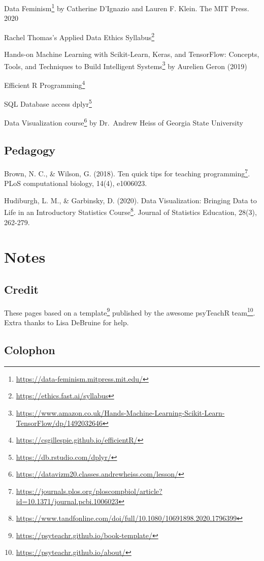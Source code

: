 \documentclass[
  12pt,
  a5paper,
]{book}
\DeclareRobustCommand{\href}[2]{#2\footnote{\url{#1}}}
\begin{document}
\href{https://data-feminism.mitpress.mit.edu/}{Data Feminism} by Catherine D'Ignazio and Lauren F. Klein. The MIT Press. 2020

Rachel Thomas's \href{https://ethics.fast.ai/syllabus}{Applied Data Ethics Syllabus}

\href{https://www.amazon.co.uk/Hands-Machine-Learning-Scikit-Learn-TensorFlow/dp/1492032646}{Hands-on Machine Learning with Scikit-Learn, Keras, and TensorFlow: Concepts, Tools, and Techniques to Build Intelligent Systems} by Aurelien Geron (2019)

\href{https://csgillespie.github.io/efficientR/}{Efficient R Programming}

SQL \href{https://db.rstudio.com/dplyr/}{Database access dplyr}

\href{https://datavizm20.classes.andrewheiss.com/lesson/}{Data Visualization course} by Dr.~Andrew Heiss of Georgia State University

\hypertarget{pedagogy}{%
\section{Pedagogy}\label{pedagogy}}

Brown, N. C., \& Wilson, G. (2018). \href{https://journals.plos.org/ploscompbiol/article?id=10.1371/journal.pcbi.1006023}{Ten quick tips for teaching programming}. PLoS computational biology, 14(4), e1006023.

Hudiburgh, L. M., \& Garbinsky, D. (2020). \href{https://www.tandfonline.com/doi/full/10.1080/10691898.2020.1796399}{Data Visualization: Bringing Data to Life in an Introductory Statistics Course}. Journal of Statistics Education, 28(3), 262-279.

\hypertarget{notes}{%
\chapter{Notes}\label{notes}}

\hypertarget{credit}{%
\section{Credit}\label{credit}}

These pages based on \href{https://psyteachr.github.io/book-template/}{a template} published by the awesome \href{https://psyteachr.github.io/about/}{psyTeachR team}. Extra thanks to Lisa DeBruine for help.

\hypertarget{colophon}{%
\section{Colophon}\label{colophon}}
\end{document}
